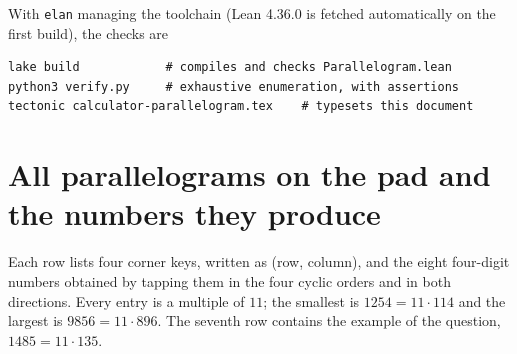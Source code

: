 \documentclass[11pt,a4paper]{article}
\theoremstyle{definition}
\theoremstyle{remark}
\newcommand{\code}[1]{\texttt{#1}}
\begin{document}
With \code{elan} managing the toolchain (Lean 4.36.0 is fetched automatically on the
first build), the checks are
\begin{verbatim}
lake build            # compiles and checks Parallelogram.lean
python3 verify.py     # exhaustive enumeration, with assertions
tectonic calculator-parallelogram.tex    # typesets this document
\end{verbatim}

\clearpage
\appendix

\section{All parallelograms on the pad and the numbers they produce}
\label{app:all}

Each row lists four corner keys, written as (row, column), and the eight four-digit
numbers obtained by tapping them in the four cyclic orders and in both directions.
Every entry is a multiple of $11$; the smallest is $1254=11\cdot 114$ and the
largest is $9856=11\cdot 896$. The seventh row contains the example of the question,
$1485=11\cdot 135$.
\end{document}
